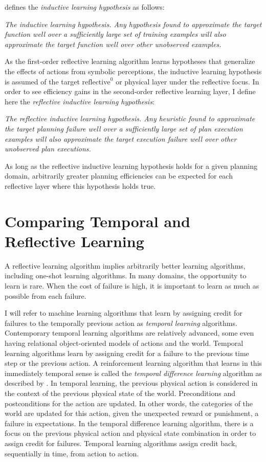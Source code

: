 \cite{mitchell:1997} defines the \emph{inductive learning hypothesis}
as follows:
\begin{definition}\emph{
\emph{The inductive learning hypothesis.} Any hypothesis found to
approximate the target function well over a sufficiently large set of
training examples will also approximate the target function well over
other unobserved examples.  }\end{definition} As the first-order
reflective learning algorithm learns hypotheses that generalize the
effects of actions from symbolic perceptions, the inductive learning
hypothesis is assumed of the target $\text{reflective}^0$ or physical
layer under the reflective focus.  In order to see efficiency gains in
the second-order reflective learning layer, I define here the
\emph{reflective inductive learning hypothesis}:
\begin{definition}\emph{
\emph{The reflective inductive learning hypothesis.} Any heuristic
found to approximate the target planning failure well over a
sufficiently large set of plan execution examples will also
approximate the target execution failure well over other unobserved
plan executions.}\end{definition} As long as the reflective inductive
learning hypothesis holds for a given planning domain, arbitrarily
greater planning efficiencies can be expected for each reflective
layer where this hypothesis holds true.

\section{Comparing Temporal and Reflective Learning}

A reflective learning algorithm implies arbitrarily better learning
algorithms, including one-shot learning algorithms.  In many domains,
the opportunity to learn is rare.  When the cost of failure is high,
it is important to learn as much as possible from each failure.

I will refer to machine learning algorithms that learn by assigning
credit for failures to the temporally previous action as
\emph{temporal learning} algorithms.  Contemporary temporal learning
algorithms are relatively advanced, some even having relational
object-oriented models of actions and the world.  Temporal learning
algorithms learn by assigning credit for a failure to the previous
time step or the previous action.  A reinforcement learning algorithm
that learns in this immediately temporal sense is called the
\emph{temporal difference learning} algorithm as described by
\cite*{kaelbling:1996}.  In temporal learning, the previous physical
action is considered in the context of the previous physical state of
the world.  Preconditions and postconditions for the action are
updated.  In other words, the categories of the world are updated for
this action, given the unexpected reward or punishment, a failure in
expectations.  In the temporal difference learning algorithm, there is
a focus on the previous physical action and physical state combination
in order to assign credit for failures.  Temporal learning algorithms
assign credit back, sequentially in time, from action to action.

